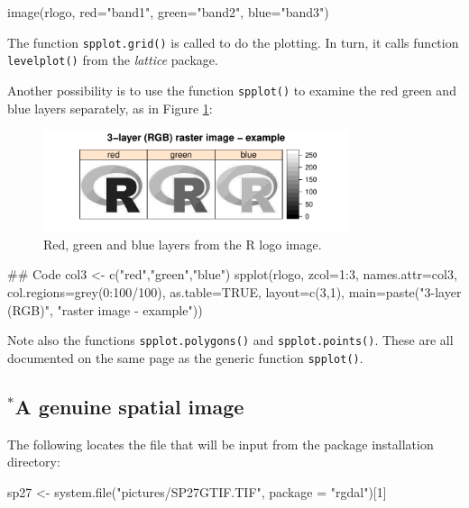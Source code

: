 \documentclass{tufte-book}\usepackage[]{graphicx}\usepackage[]{color}
\newcommand{\txtt}[1]{\texttt{#1}}
\begin{document}
\begin{Schunk}
\begin{Sinput}
image(rlogo, red="band1",
      green="band2",
      blue="band3")
\end{Sinput}
\end{Schunk}
\noindent
The function \txtt{spplot.grid()} is called to do the plotting.
In turn, it calls function \txtt{levelplot()} from the
{\em lattice} package.

Another possibility is to use the function \texttt{spplot()}
  to examine the red green and blue layers separately, as in Figure
  \ref{fig:rlogo3}:
\begin{figure}
\begin{Schunk}


\centerline{\includegraphics[width=0.8\textwidth]{figs/10-spplot-col3-1} }

\end{Schunk}
\caption{Red, green and blue layers from the R logo image.\label{fig:rlogo3}}
\end{figure}
\begin{Schunk}
\begin{Sinput}
## Code
col3 <- c("red","green","blue")
spplot(rlogo, zcol=1:3, names.attr=col3,
       col.regions=grey(0:100/100), as.table=TRUE,
       layout=c(3,1), main=paste("3-layer (RGB)",
       "raster image - example"))
\end{Sinput}
\end{Schunk}

  Note also the functions \txtt{spplot.polygons()} and
  \txtt{spplot.points()}.  These are all documented on the same page
  as the generic function \txtt{spplot()}.

\subsection*{$^*$A genuine spatial image}

The following locates the file that will be input
from the package installation directory:
\begin{Schunk}
\begin{Sinput}
sp27 <- system.file("pictures/SP27GTIF.TIF",
                    package = "rgdal")[1]
\end{Sinput}
\end{Schunk}
\end{document}
